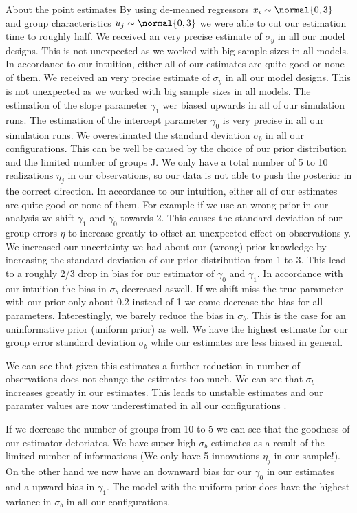 About the point estimates
By using de-meaned  regressors $x_i\sim\normal{0,3}$ and group characteristics $u_j\sim\normal{0,3}$ we were able to cut our estimation time to roughly half.  
We received an very precise estimate of $\sigma_y$ in all our model designs. This is not unexpected as we worked with big sample sizes in all models.
In accordance to our intuition, either all of our estimates are quite good or none of them. 
We received an very precise estimate of $\sigma_y$ in all our model designs. This is not unexpected as we worked with big sample sizes in all models.
The estimation of the slope parameter $\gamma_1$ wer biased upwards in all of our simulation runs.
The estimation of the intercept parameter $\gamma_0$ is very precise in all our simulation runs.
We overestimated the standard deviation $\sigma_b$ in all our configurations. This can be well be caused by the choice of our prior distribution and the limited number of groups J. We only have a total number of 5 to 10 realizations $\eta_j$ in our observations, so our data is not able to push the posterior in the correct direction.
In accordance to our intuition, either all of our estimates are quite good or none of them. 
For example if we use an wrong prior in our analysis we shift $\gamma_1$ and $\gamma_0$ towards 2. 
This causes the standard deviation of our group errors $\eta$ to increase greatly to offset an unexpected effect on observations y.
We increased our uncertainty we had about our (wrong) prior knowledge by increasing the standard deviation of our prior distribution from 1 to 3. This lead to a roughly 2/3 drop in bias for our estimator of $\gamma_0$ and $\gamma_1$. 
In accordance with our intuition the bias in $\sigma_b$ decreased aswell.
If we shift miss the true parameter with our prior only about 0.2 instead of 1 we come decrease the bias for all parameters. Interestingly, we barely reduce the bias in $\sigma_b$.
This is the case for an uninformative prior (uniform prior) as well. We have the highest estimate for our group error standard deviation $\sigma_b$ while our estimates are less biased in general. 

We can see that given this estimates a further reduction in number of observations does not change the estimates too much. We can see that $\sigma_b$ increases greatly in our estimates. This leads to unstable estimates and our paramter values are now underestimated in all our configurations . 

If we decrease the number of groups from 10 to 5 we can see that the goodness of our estimator detoriates. We have super high $\sigma_b$ estimates as a result of the limited number of informations (We only have 5 innovations $\eta_j$ in our sample!).
On the other hand we now have an downward bias for our $\gamma_0$ in our estimates and a upward bias in $\gamma_1$. 
The model with the uniform prior does have the highest variance in $\sigma_b$ in all our configurations. 

